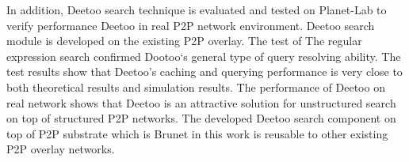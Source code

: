 \documentclass[9.5pt,journal,final,finalsubmission,twocolumn]{IEEEtran}
\begin{document}
In addition, Deetoo search technique is evaluated and tested on Planet-Lab
to verify performance Deetoo in real P2P network environment.
Deetoo search module is developed on the existing P2P overlay.
The test of The regular expression search confirmed Dootoo`s general type of query
resolving ability.
The test results show that Deetoo's caching and querying performance
is very close to both theoretical results and simulation results.
The performance of Deetoo on real network shows that Deetoo is an attractive 
solution for unstructured search on top of structured P2P networks.
The developed Deetoo search component on top of P2P substrate which is Brunet 
in this work is reusable to other existing P2P overlay networks.




\end{document}
